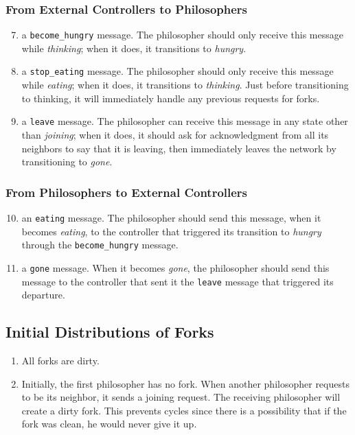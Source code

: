 \documentclass[11pt]{article}
\begin{document}
\subsubsection{From External Controllers to Philosophers}
\begin{enumerate}[M1]
\setcounter{enumi}{6}
\item \label{M:become_hungry} a \texttt{become\_hungry} message. The philosopher should only receive this message while \textit{thinking}; when it does, it transitions to \textit{hungry}.
\item \label{M:stop_eating} a \texttt{stop\_eating} message. The philosopher should only receive this message while \textit{eating}; when it does, it transitions to \textit{thinking}. Just before transitioning to thinking, it will immediately handle any previous requests for forks.
\item \label{M:leave} a \texttt{leave} message. The philosopher can receive this message in any state other than \textit{joining}; when it does, it should ask for acknowledgment from all its neighbors to say that it is leaving, then immediately leaves the network by transitioning to \emph{gone}.
\end{enumerate}

\subsubsection{From Philosophers to External Controllers}
\begin{enumerate}[M1]
\setcounter{enumi}{9}
\item an \texttt{eating} message. The philosopher should send this message, when it becomes \textit{eating}, to the controller that triggered its transition to \textit{hungry} through the \texttt{become\_hungry} message.
\item a \texttt{gone} message. When it becomes \textit{gone}, the philosopher should send this message to the controller that sent it the \texttt{leave} message that triggered its departure.
\end{enumerate}

\subsection{Initial Distributions of Forks}
\begin{enumerate}
\item All forks are dirty.
\item Initially, the first philosopher has no fork. When another philosopher requests to be its neighbor, it sends a joining request. The receiving philosopher will create a dirty fork. This prevents cycles since there is a possibility that if the fork was clean, he would never give it up.
\end{enumerate}
\end{document}
